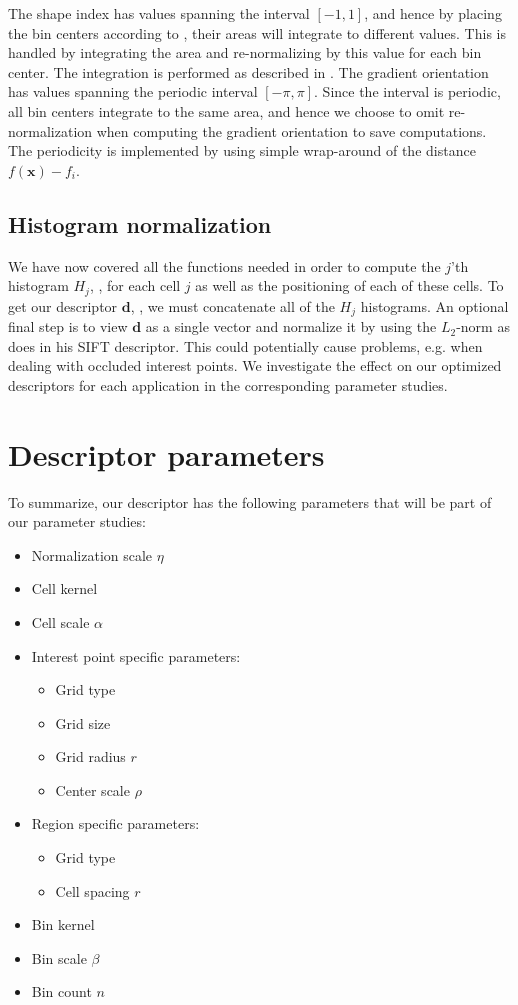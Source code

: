 \documentclass[thesis.tex]{subfiles}
\def\x{\mathbf{x}}
\def\d{\mathbf{d}}
\begin{document}
The shape index has values spanning the interval $[-1,1]$, and hence by placing the bin centers according to , their areas will integrate to different values. This is handled by integrating the area and re-normalizing by this value for each bin center. The integration is performed as described in . The gradient orientation has values spanning the periodic interval $[-\pi,\pi]$. Since the interval is periodic, all bin centers integrate to the same area, and hence we choose to omit re-normalization when computing the gradient orientation to save computations. The periodicity is implemented by using simple wrap-around of the distance $f(\x) - f_i$.
%
\subsection{Histogram normalization}
%
We have now covered all the functions needed in order to compute the $j$'th histogram $H_j$, , for each cell $j$ as well as the positioning of each of these cells. To get our descriptor $\d$, , we must concatenate all of the $H_j$ histograms. An optional final step is to view $\d$ as a single vector and normalize it by using the $L_2$-norm as \citet{lowe2004distinctive} does in his SIFT descriptor. This could potentially cause problems, e.g. when dealing with occluded interest points. We investigate the effect on our optimized descriptors for each application in the corresponding parameter studies.
%
\section{Descriptor parameters}
\label{sec:descriptorParameters}
%
To summarize, our descriptor has the following parameters that will be part of our parameter studies:
%
\begin{itemize}
\itemsep0em
\item Normalization scale $\eta$
\item Cell kernel
\item Cell scale $\alpha$
\item Interest point specific parameters:
\begin{itemize}
\item Grid type
\item Grid size
\item Grid radius $r$ 
\item Center scale $\rho$
\end{itemize}
\item Region specific parameters:
\begin{itemize}
\item Grid type
\item Cell spacing $r$
\end{itemize}
\item Bin kernel
\item Bin scale $\beta$
\item Bin count $n$
\end{itemize}
%
\end{document}
